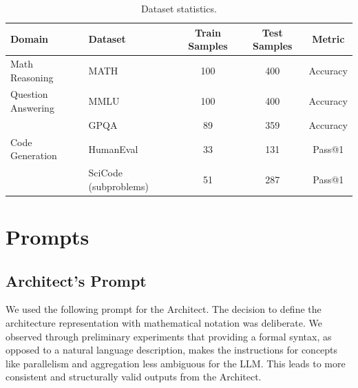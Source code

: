 \documentclass{article} %
\providecommand{\multirow}{}
\begin{document}
\begin{table}[H]
\centering
\caption{Dataset statistics.}
\label{tab:dataset_stats}
\begin{tabular}{l lccc}
\toprule
Domain           & Dataset    & Train Samples & Test Samples & Metric   \\ \midrule
\multirow{Math Reasoning} & MATH  & 100      & 400    & Accuracy   \\ \midrule
\multirow{Question Answering}  
                & MMLU      & 100     & 400   & Accuracy \\ 
                & GPQA      & 89 & 359 & Accuracy \\                
\midrule
Code Generation         & HumanEval       & 33      & 131    & Pass@1 \\
                        & SciCode (subproblems) & 51 & 287 & Pass@1 \\
\bottomrule
\end{tabular}
\end{table}

\section{Prompts}
\subsection{Architect's Prompt}
\label{app:architect_prompt}
We used the following prompt for the Architect. The decision to define the architecture representation with mathematical notation was deliberate. We observed through preliminary experiments that providing a formal syntax, as opposed to a natural language description, makes the instructions for concepts like parallelism and aggregation less ambiguous for the LLM. This leads to more consistent and structurally valid outputs from the Architect.
\end{document}
